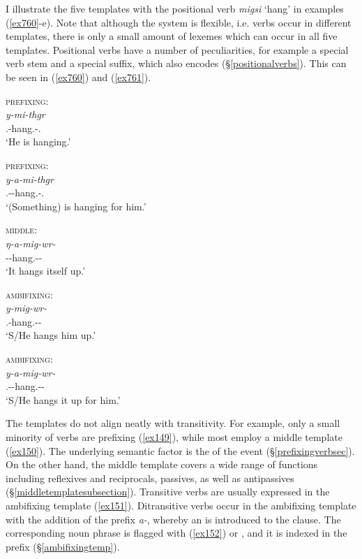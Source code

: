 I illustrate the five templates with the positional verb \emph{migsi} `hang' in examples (\ref{ex760}-e). Note that although the system is flexible, i.e. verbs occur in different templates, there is only a small amount of  lexemes which can occur in all five templates. Positional verbs have a number of peculiarities, for example a special verb stem and a special  suffix, which also encodes  (\S\ref{positionalverbs}). This can be seen in (\ref{ex760}) and  (\ref{ex761}).

\begin{exe}
\ex
\label{ex759}
\begin{xlist}
	\ex \textsc{prefixing}:\\
	\gll \emph{y-mi-thgr}\\
	 	\Tsg.\Masc-hang.\Pos-\Stat.\Ndu\\
	\trans `He is hanging.'
	\label{ex760}

	\ex \textsc{ prefixing}:\\
	\gll \emph{y-a-mi-thgr}\\
	 	\Tsg.\Masc-\Vc-hang.\Pos-\Stat.\Ndu\\
	\trans `(Something) is hanging for him.'
	\label{ex761}

	\ex \textsc{middle}:\\
	\gll \emph{ŋ-a-mig-wr-\Zero}\\
	 	\M-\Vc-hang.\Ext-\Ndu-\Stsg\\
	\trans `It hangs itself up.'
	\label{ex762}

	\ex \textsc{ ambifixing}:\\
	\gll \emph{y-mig-wr-\Zero}\\
	 	\Tsg.\Masc-hang.\Ext-\Ndu-\Stsg\\
	\trans `S/He hangs him up.'
	\label{ex763}

	\ex \textsc{ ambifixing}:\\
	\gll \emph{y-a-mig-wr-\Zero}\\
	 	\Tsg.\Masc-\Vc-hang.\Ext-\Ndu-\Stsg\\
	\trans `S/He hangs it up for him.'
	\label{ex764}
\end{xlist}
\end{exe}

The templates do not align neatly with transitivity. For example, only a small minority of  verbs are prefixing (\ref{ex149}), while most employ a middle template (\ref{ex150}). The underlying semantic factor is the  of the event ({\S}\ref{prefixingverbsec}). On the other hand, the middle template covers a wide range of functions including reflexives and reciprocals, passives, as well as antipassives ({\S}\ref{middletemplatesubsection}). Transitive verbs are usually expressed in the ambifixing template (\ref{ex151}). Ditransitive verbs occur in the ambifixing template with the addition of the  prefix \emph{a-}, whereby an  is introduced to the clause. The corresponding noun phrase is flagged with  (\ref{ex152}) or  , and it is indexed in the  prefix ({\S}\ref{ambifixingtemp}).

